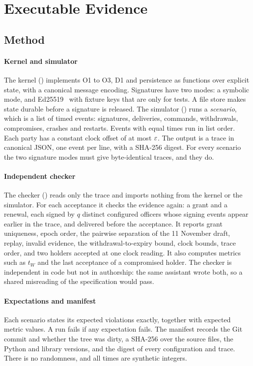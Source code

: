 \section{Executable Evidence}
\label{sec:evidence}

\subsection{Method}
\label{sec:method}

\paragraph{Kernel and simulator}
The kernel () implements O1 to O3, D1 and persistence as functions over
explicit state, with a canonical message encoding. Signatures have two modes: a symbolic
mode, and Ed25519~\cite{rfc8032} with fixture keys that are only for tests. A file store
makes state durable before a signature is released. The simulator () runs a
\emph{scenario}, which is a list of timed events: signatures, deliveries, commands,
withdrawals, compromises, crashes and restarts. Events with equal times run in list
order. Each party has a constant clock offset of at most $\varepsilon$. The output is a trace in
canonical JSON, one event per line, with a SHA-256 digest. For every scenario the two
signature modes must give byte-identical traces, and they do.

\paragraph{Independent checker}
The checker () reads only the trace and imports nothing
from the kernel or the simulator. For each acceptance it checks the evidence again: a
grant and a renewal, each signed by $q$ distinct configured officers whose signing events
appear earlier in the trace, and delivered before the acceptance. It reports grant
uniqueness, epoch order, the pairwise separation of the 11 November draft, replay,
invalid evidence, the withdrawal-to-expiry bound, clock bounds, trace order, and two
holders accepted at one clock reading. It also computes metrics such as $t_W$ and the
last acceptance of a compromised holder. The checker is independent in code but not in
authorship: the same assistant wrote both, so a shared misreading of the specification
would pass.

\paragraph{Expectations and manifest}
Each scenario states its expected violations exactly, together with expected metric
values. A run fails if any expectation fails. The manifest records the Git commit and
whether the tree was dirty, a SHA-256 over the source files, the Python and library
versions, and the digest of every configuration and trace. There is no randomness, and
all times are synthetic integers.

